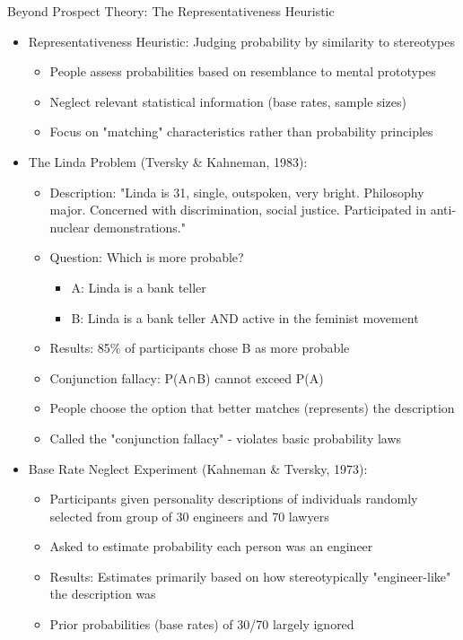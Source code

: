 \documentclass[10pt,handout]{beamer}
\begin{document}
\begin{frame}{Beyond Prospect Theory: The Representativeness Heuristic}
  \begin{itemize}[<+->]
    \item Representativeness Heuristic: Judging probability by similarity to stereotypes
      \begin{itemize}
        \item People assess probabilities based on resemblance to mental prototypes
        \item Neglect relevant statistical information (base rates, sample sizes)
        \item Focus on "matching" characteristics rather than probability principles
      \end{itemize}
    \item The Linda Problem (Tversky \& Kahneman, 1983):
      \begin{itemize}
        \item Description: "Linda is 31, single, outspoken, very bright. Philosophy major. Concerned with discrimination, social justice. Participated in anti-nuclear demonstrations."
        \item Question: Which is more probable?
          \begin{itemize}
            \item A: Linda is a bank teller
            \item B: Linda is a bank teller AND active in the feminist movement
          \end{itemize}
        \item Results: 85\% of participants chose B as more probable
        \item Conjunction fallacy: P(A∩B) cannot exceed P(A)
        \item People choose the option that better matches (represents) the description
        \item Called the "conjunction fallacy" - violates basic probability laws
      \end{itemize}
    \item Base Rate Neglect Experiment (Kahneman \& Tversky, 1973):
      \begin{itemize}
        \item Participants given personality descriptions of individuals randomly selected from group of 30 engineers and 70 lawyers
        \item Asked to estimate probability each person was an engineer
        \item Results: Estimates primarily based on how stereotypically "engineer-like" the description was
        \item Prior probabilities (base rates) of 30/70 largely ignored
      \end{itemize}
  \end{itemize}
\end{frame}
\end{document}

